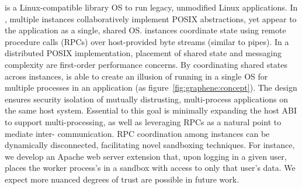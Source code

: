 {\bf \sysname{}} is a Linux-compatible library OS
to run legacy, unmodified Linux applications.
In \sysname{}, multiple \libos{} instances collaboratively implement
POSIX abstractions,
yet appear to the application
as a single, shared OS.
\sysname{} instances coordinate state using remote procedure calls (RPCs) over
host-provided byte streams (similar to pipes).
In a distributed POSIX implementation, placement of shared state and messaging complexity
are first-order performance concerns.
By coordinating shared states across \libos{} instances,
\sysname{} is able to create an illusion 
of running in a single OS
for multiple processes in an application (as figure~\ref{fig:graphene:concept}).
The \sysname{} design ensures security isolation of
mutually distrusting, multi-process
applications on the same host system.
Essential to this goal is
minimally expanding the host ABI to support multi-processing,
as well as leveraging RPCs as a natural point to mediate inter-\picoproc{} communication.
RPC coordination among \sysname{} instances can be dynamically disconnected, facilitating novel sandboxing
techniques.  For instance, we develop an Apache web server extension that, upon logging in a given user,
places the worker process's \libos{} in a sandbox with access to only that user's data.
We expect more nuanced degrees of trust are possible in future work.

